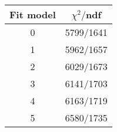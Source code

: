 \begin{tabular}{c|c}
Fit model & $\chi^2/$ndf \\
\hline
0 & 5799/1641\\
1 & 5962/1657\\
2 & 6029/1673\\
3 & 6141/1703\\
4 & 6163/1719\\
5 & 6580/1735\\
\end{tabular}
